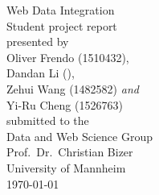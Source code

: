 \documentclass[11pt,titlepage,oneside,openany]{article}
\begin{document}
\begin{titlepage}
	\vspace*{2cm}
  \begin{center}
   {\Large Web Data Integration\\}
   \vspace{2cm} 
   {Student project report\\}
   \vspace{2cm}
   {presented by\\
    Oliver Frendo (1510432), \\
    Dandan Li (),\\
    Zehui Wang (1482582) \textit{and} \\
	Yi-Ru Cheng (1526763) \\
   }
   \vspace{1cm} 
   {submitted to the\\
    Data and Web Science Group\\
    Prof.\ Dr.\ Christian Bizer\\
    University of Mannheim\\} \vspace{2cm}
   {\today}
  \end{center}
\end{titlepage} 

\tableofcontents
\newpage


\listoffigures

\listoftables


\newpage








\newpage






\newpage


\pagestyle{empty}
\end{document}
